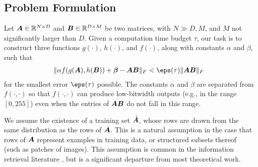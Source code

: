 \subsection{Problem Formulation} \label{sec:problemStatement}

Let $\bm{A} \in \mathbb{R}^{N \times D}$ and $\bm{B} \in \mathbb{R}^{D \times M}$ be two matrices, with $N \gg D, M$, and $M$ not significantly larger than $D$. Given a computation time budget $\tau$, our task is to
construct three functions $g(\cdot)$, $h(\cdot)$, and $f(\cdot)$, along with constants $\alpha$ and $\beta$, such that
\begin{align} \label{eq:objective}
    \norm{\alpha f(g(\A), h(\B)) + \mat{\beta} - \A\B}_F < \eps(\tau) \norm{\A\B}_F
\end{align}
for the smallest error $\eps(\tau)$ possible. The constants $\alpha$ and $\beta$ are separated from $f(\cdot,\cdot)$ so that $f(\cdot,\cdot)$ can produce low-bitwidth outputs (e.g., in the range $[0, 255]$) even when the entries of $\bm{A}\bm{B}$ do not fall in this range.





We assume the existence of a training set $\tilde{\bm{A}}$, whose rows are drawn from the same distribution as the rows of $\bm{A}$. This is a natural assumption in the case that rows of $\bm{A}$ represent examples in training data, or structured subsets thereof (such as patches of images). This assumption is common in the information retrieval literature \cite{bolt,pairq,quip}, but is a significant departure from most theoretical work.



